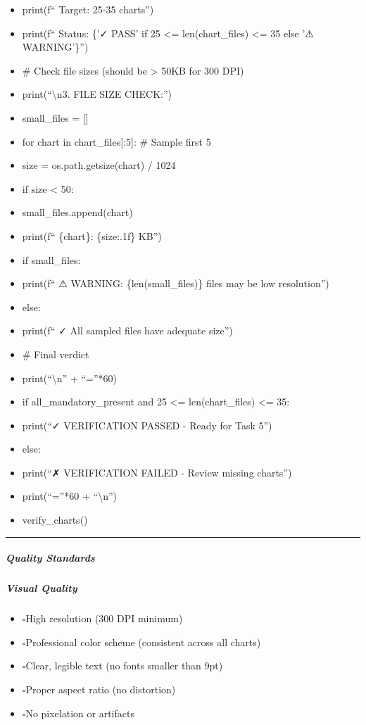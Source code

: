 \documentclass[11pt]{article}
\newcommand{\UncheckedBox}{$\square$}
\begin{document}
\begin{itemize}[leftmargin=*,itemsep=2pt,topsep=2pt]
\item {} print(f`` Target: 25-35 charts'')
\item {} print(f`` Status: \{'✓ PASS' if 25 <= len(chart\_\allowbreak{}files) <= 35 else '⚠ WARNING'\}'')
\item {} \# Check file sizes (should be > 50KB for 300 DPI)
\item {} print(``\textbackslash{}n3. FILE SIZE CHECK:'')
\item {} small\_\allowbreak{}files = []
\item {} for chart in chart\_\allowbreak{}files[:5]: \# Sample first 5
\item {} size = os.path.getsize(chart) / 1024
\item {} if size < 50:
\item {} small\_\allowbreak{}files.append(chart)
\item {} print(f`` \{chart\}: \{size:.1f\} KB'')
\item {} if small\_\allowbreak{}files:
\item {} print(f`` ⚠ WARNING: \{len(small\_\allowbreak{}files)\} files may be low resolution'')
\item {} else:
\item {} print(f`` ✓ All sampled files have adequate size'')
\item {} \# Final verdict
\item {} print(``\textbackslash{}n'' + ``=''*60)
\item {} if all\_\allowbreak{}mandatory\_\allowbreak{}present and 25 <= len(chart\_\allowbreak{}files) <= 35:
\item {} print(``✓ VERIFICATION PASSED - Ready for Task 5'')
\item {} else:
\item {} print(``✗ VERIFICATION FAILED - Review missing charts'')
\item {} print(``=''*60 + ``\textbackslash{}n'')
\item {} verify\_\allowbreak{}charts()
\end{itemize}

\vspace{0.5em}\hrule\vspace{0.5em}

\subparagraph{Quality Standards}\mbox{}\par

\subparagraph{Visual Quality}\mbox{}\par
\begin{itemize}[leftmargin=*,itemsep=2pt,topsep=2pt]
\item {} \UncheckedBox High resolution (300 DPI minimum)
\item {} \UncheckedBox Professional color scheme (consistent across all charts)
\item {} \UncheckedBox Clear, legible text (no fonts smaller than 9pt)
\item {} \UncheckedBox Proper aspect ratio (no distortion)
\item {} \UncheckedBox No pixelation or artifacts
\end{itemize}
\end{document}
